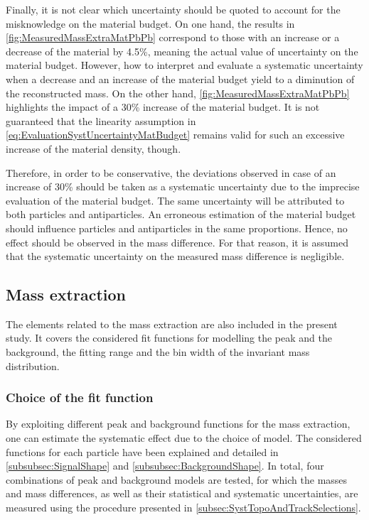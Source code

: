 Finally, it is not clear which uncertainty should be quoted to account for the misknowledge on the material budget. On one hand, the results in \fig\ref{fig:MeasuredMassExtraMatPbPb} correspond to those with an increase or a decrease of the material by 4.5\%, meaning the actual value of uncertainty on the material budget. However, how to interpret and evaluate a systematic uncertainty when a decrease and an increase of the material budget yield to a diminution of the reconstructed mass. On the other hand, \fig\ref{fig:MeasuredMassExtraMatPbPb} highlights the impact of a 30\% increase of the material budget. It is not guaranteed that the linearity assumption in \eq\ref{eq:EvaluationSystUncertaintyMatBudget} remains valid for such an excessive increase of the material density, though.

Therefore, in order to be conservative, the deviations observed in case of an increase of 30\% should be taken as a systematic uncertainty due to the imprecise evaluation of the material budget. The same uncertainty will be attributed to both particles and antiparticles. An erroneous estimation of the material budget should influence particles and antiparticles in the same proportions. Hence, no effect should be observed in the mass difference. For that reason, it is assumed that the systematic uncertainty on the measured mass difference is negligible. 


\subsection{Mass extraction}

The elements related to the mass extraction are also included in the present study. It covers the considered fit functions for modelling the peak and the background, the fitting range and the bin width of the invariant mass distribution.

\subsubsection{Choice of the fit function}

By exploiting different peak and background functions for the mass extraction, one can estimate the systematic effect due to the choice of model. The considered functions for each particle have been explained and detailed in \Sec\ref{subsubsec:SignalShape} and \Sec\ref{subsubsec:BackgroundShape}. In total, four combinations of peak and background models are tested, for which the masses and mass differences, as well as their statistical and systematic uncertainties, are measured using the procedure presented in \Sec\ref{subsec:SystTopoAndTrackSelections}. 

